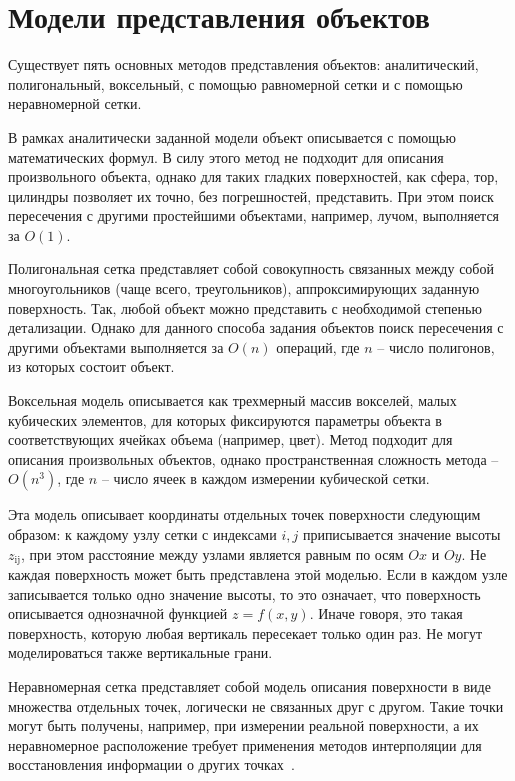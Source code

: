 \section{Модели представления объектов}
Существует пять основных методов представления объектов: аналитический, полигональный, воксельный, с помощью равномерной сетки и с помощью неравномерной сетки.

В рамках аналитически заданной модели объект описывается с помощью математических формул. В силу этого метод не подходит для описания произвольного объекта, однако для таких гладких поверхностей, как сфера, тор, цилиндры позволяет их точно, без погрешностей, представить. При этом поиск пересечения с другими простейшими объектами, например, лучом, выполняется за $O(1)$.

Полигональная сетка представляет собой совокупность связанных между собой многоугольников (чаще всего, треугольников), аппроксимирующих заданную поверхность. Так, любой объект можно представить с необходимой степенью детализации. Однако для данного способа задания объектов поиск пересечения с другими объектами выполняется за $O(n)$ операций, где $n$ -- число полигонов, из которых состоит объект.

Воксельная модель описывается как трехмерный массив вокселей, малых кубических элементов, для которых фиксируются параметры объекта в соответствующих ячейках объема (например, цвет). Метод подходит для описания произвольных объектов, однако пространственная сложность метода -- $O(n^3)$, где $n$ -- число ячеек в каждом измерении кубической сетки.

Эта модель описывает координаты отдельных точек поверхности следующим образом: к каждому узлу сетки с индексами $i, j$ приписывается значение высоты $z_\text{ij}$, при этом расстояние между узлами является равным по осям $Ox$ и $Oy$. Не каждая поверхность может быть представлена этой моделью. Если в каж­дом узле записывается только одно значение высоты, то это означает, что поверхность описывается однозначной функцией $z=f(x,y)$. Иначе говоря, это такая поверхность, которую любая вертикаль пересекает только один раз. Не могут моделироваться также вертикальные грани.

Неравномерная сетка представляет собой модель описания поверхности в виде множества отдельных точек, логически не связанных друг с другом. Такие точки могут быть получены, например, при измерении реальной поверхности, а их неравномерное расположение требует применения методов интерполяции для восстановления информации о других точках~\cite{lit9}.

